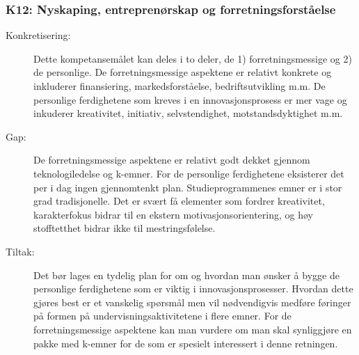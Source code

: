 \subsubsection{K12: Nyskaping, entreprenørskap og forretningsforståelse}
\begin{description}
\item[Konkretisering:] Dette kompetansemålet kan deles i to deler, de 1) forretningsmessige og 2) de personlige. De forretningsmessige aspektene er relativt konkrete og inkluderer finansiering, markedsforståelse, bedriftsutvikling m.m. De personlige ferdighetene som kreves i en innovasjonsprosess er mer vage og inkuderer kreativitet, initiativ, selvstendighet, motstandsdyktighet m.m.
\item[Gap:] De forretningsmessige aspektene er relativt godt dekket gjennom teknologiledelse og k-emner. For de personlige ferdighetene eksisterer det per i dag ingen gjennomtenkt plan. Studieprogrammenes emner er i stor grad tradisjonelle. Det er svært få elementer som fordrer kreativitet, karakterfokus bidrar til en ekstern motivasjonsorientering, og høy stofftetthet bidrar ikke til mestringsfølelse. 
\item[Tiltak:] Det bør lages en tydelig plan for om og hvordan man ønsker å bygge de personlige ferdighetene som er viktig i innovasjonsprosesser. Hvordan dette gjøres best er et vanskelig spørsmål men vil nødvendigvis medføre føringer på formen på undervisningsaktivitetene i flere emner. For de forretningsmessige aspektene kan man vurdere om man skal synliggjøre en pakke med k-emner for de som er spesielt interessert i denne retningen.
\end{description}